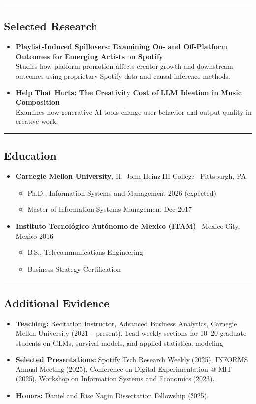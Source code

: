 \documentclass[10pt,letterpaper]{article}
\newcommand{\sep}{{\color{gray}\,\textbullet\,\,}}
\newcommand{\hsep}{\noindent\textcolor{gray}{\rule{\textwidth}{0.5pt}}}
\newcommand{\block}[1]{\begin{samepage}\hsep\subsection*{#1}\end{samepage}}
\begin{document}
\block{Selected Research}

\begin{itemize}[leftmargin=0pt, label={}]
\item \textbf{Playlist-Induced Spillovers: Examining On- and Off-Platform Outcomes for Emerging Artists on Spotify} \\
Studies how platform promotion affects creator growth and downstream outcomes using proprietary Spotify data and causal inference methods.
\item \textbf{Help That Hurts: The Creativity Cost of LLM Ideation in Music Composition} \\
Examines how generative AI tools change user behavior and output quality in creative work.
\end{itemize}

\block{Education}

\begin{itemize}[leftmargin=0pt, label={}]
\item \textbf{Carnegie Mellon University}, H.\ John Heinz III College \sep Pittsburgh, PA
  \begin{itemize}[label={}]
  \item Ph.D., Information Systems and Management \hfill 2026 (expected)
  \item Master of Information Systems Management \hfill Dec 2017
  \end{itemize}
\item \textbf{Instituto Tecnol\'ogico Aut\'onomo de Mexico (ITAM)} \sep Mexico City, Mexico \hfill 2016
  \begin{itemize}[label={}]
  \item B.S., Telecommunications Engineering
  \item Business Strategy Certification
  \end{itemize}
\end{itemize}

\block{Additional Evidence}

\begin{itemize}[leftmargin=0pt, label={}]
\item \textbf{Teaching:} Recitation Instructor, Advanced Business Analytics, Carnegie Mellon University (2021 -- present). Lead weekly sections for 10--20 graduate students on GLMs, survival models, and applied statistical modeling.
\item \textbf{Selected Presentations:} Spotify Tech Research Weekly (2025), INFORMS Annual Meeting (2025), Conference on Digital Experimentation @ MIT (2025), Workshop on Information Systems and Economics (2023).
\item \textbf{Honors:} Daniel and Rise Nagin Dissertation Fellowship (2025).
\end{itemize}
\end{document}
